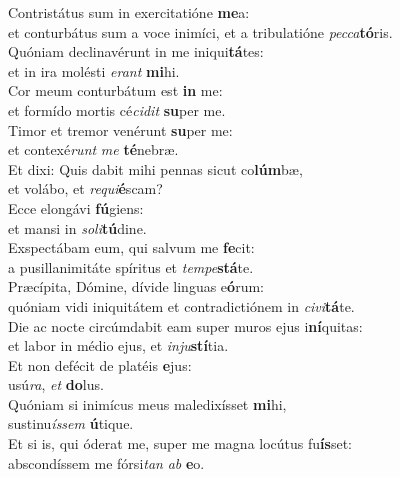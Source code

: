 \evenverse Contristátus sum in exercitatióne \textbf{me}a:~\*\\
\evenverse et conturbátus sum a voce inimíci, et a tribulatióne \textit{pec}\textit{ca}\textbf{tó}ris.\\
\oddverse Quóniam declinavérunt in me iniqui\textbf{tá}tes:~\*\\
\oddverse et in ira molésti \textit{e}\textit{rant} \textbf{mi}hi.\\
\evenverse Cor meum conturbátum est \textbf{in} me:~\*\\
\evenverse et formído mortis cé\textit{ci}\textit{dit} \textbf{su}per me.\\
\oddverse Timor et tremor venérunt \textbf{su}per me:~\*\\
\oddverse et contexé\textit{runt} \textit{me} \textbf{té}nebræ.\\
\evenverse Et dixi: Quis dabit mihi pennas sicut co\textbf{lúm}bæ,~\*\\
\evenverse et volábo, et \textit{re}\textit{qui}\textbf{é}scam?\\
\oddverse Ecce elongávi \textbf{fú}giens:~\*\\
\oddverse et mansi in \textit{so}\textit{li}\textbf{tú}dine.\\
\evenverse Exspectábam eum, qui salvum me \textbf{fe}cit:~\*\\
\evenverse a pusillanimitáte spíritus et \textit{tem}\textit{pe}\textbf{stá}te.\\
\oddverse Præcípita, Dómine, dívide linguas e\textbf{ó}rum:~\*\\
\oddverse quóniam vidi iniquitátem et contradictiónem in \textit{ci}\textit{vi}\textbf{tá}te.\\
\evenverse Die ac nocte circúmdabit eam super muros ejus i\textbf{ní}quitas:~\*\\
\evenverse et labor in médio ejus, et \textit{in}\textit{ju}\textbf{stí}tia.\\
\oddverse Et non defécit de platéis \textbf{e}jus:~\*\\
\oddverse usú\textit{ra}, \textit{et} \textbf{do}lus.\\
\evenverse Quóniam si inimícus meus maledixísset \textbf{mi}hi,~\*\\
\evenverse sustinu\textit{ís}\textit{sem} \textbf{ú}tique.\\
\oddverse Et si is, qui óderat me, super me magna locútus fu\textbf{ís}set:~\*\\
\oddverse abscondíssem me fórsi\textit{tan} \textit{ab} \textbf{e}o.\\
